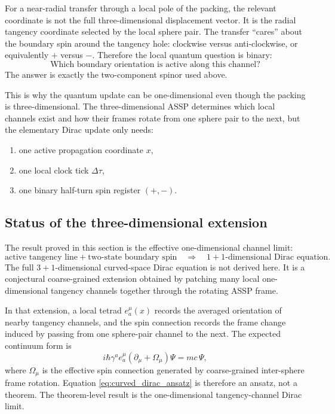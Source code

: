 \documentclass[11pt,a4paper]{article}
\begin{document}
For a near-radial transfer through a local pole of the packing, the relevant
coordinate is not the full three-dimensional displacement vector.  It is the
radial tangency coordinate selected by the local sphere pair.  The transfer
``cares'' about the boundary spin around the tangency hole: clockwise versus
anti-clockwise, or equivalently \(+\) versus \(-\).  Therefore the local quantum
question is binary:
\[
  \text{Which boundary orientation is active along this channel?}
\]
The answer is exactly the two-component spinor used above.

This is why the quantum update can be one-dimensional even though the packing
is three-dimensional.  The three-dimensional ASSP determines which local
channels exist and how their frames rotate from one sphere pair to the next,
but the elementary Dirac update only needs:
\begin{enumerate}
  \item one active propagation coordinate \(x\),
  \item one local clock tick \(\Delta\tau\),
  \item one binary half-turn spin register \((+,-)\).
\end{enumerate}

\subsection{Status of the three-dimensional extension}

  The result proved in this section is the effective one-dimensional channel
  limit:
  \[
    \text{active tangency line}
    +
    \text{two-state boundary spin}
    \quad\Longrightarrow\quad
    \text{\(1+1\)-dimensional Dirac equation}.
  \]
  The full \(3+1\)-dimensional curved-space Dirac equation is not derived here.
  It is a conjectural coarse-grained extension obtained by patching many local
  one-dimensional tangency channels together through the rotating ASSP frame.

  In that extension, a local tetrad \(e^\mu_a(x)\) records the averaged
  orientation of nearby tangency channels, and the spin connection records the
  frame change induced by passing from one sphere-pair channel to the next.  The
  expected continuum form is
  \[
    i\hbar\gamma^a e^\mu_a
    \left(\partial_\mu+\Omega_\mu\right)\Psi
    =
    mc\,\Psi,
    \label{eq:curved_dirac_ansatz}
  \]
  where \(\Omega_\mu\) is the effective spin connection generated by
  coarse-grained inter-sphere frame rotation.  Equation
  \eqref{eq:curved_dirac_ansatz} is therefore an ansatz, not a theorem.  The
  theorem-level result is the one-dimensional tangency-channel Dirac limit.
\end{document}
